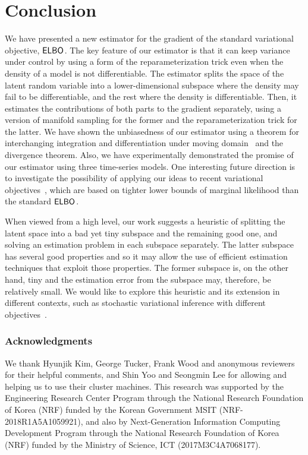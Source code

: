 
\section{Conclusion}
\label{sec:conclusion}

We have presented a new estimator for the gradient of the standard variational objective, ${\mathsf{ELBO}_{}}$. The key feature of our estimator is that it can keep variance under control by using a form of the reparameterization trick even when the density of a model is not differentiable. The estimator splits the space of the latent random variable into a lower-dimensional subspace where the density may fail to be differentiable, and the rest where the density is differentiable. Then, it estimates the contributions of both parts to the gradient separately, using a version of manifold sampling for the former and the reparameterization trick for the latter. We have shown the unbiasedness of our estimator using a theorem for interchanging integration and differentiation under moving domain~\cite{FlandersAMM1973} and the divergence theorem. Also, we have experimentally demonstrated the promise of our estimator using three time-series models. One interesting future direction is to investigate the possibility of applying our ideas to recent variational objectives~\cite{MnihICML16,LiNIPS17,MaddisonNIPS17,LeICLR2018,NaessethAISTATS18}, which are based on tighter lower bounds of marginal likelihood than the standard ${\mathsf{ELBO}_{}}$.

When viewed from a high level, our work suggests a heuristic of splitting the latent space into a bad yet tiny subspace and the remaining good one, and solving an estimation problem in each subspace separately. The latter subspace has several good properties and so it may allow the use of efficient estimation techniques that exploit those properties. The former subspace is, on the other hand, tiny and the estimation error from the subspace may, therefore, be relatively small. We would like to explore this heuristic and its extension in different contexts, such as stochastic variational inference with different objectives~\cite{MnihICML16,LiNIPS17,MaddisonNIPS17,LeICLR2018,NaessethAISTATS18}.

\subsubsection*{Acknowledgments}

We thank Hyunjik Kim, George Tucker, Frank Wood and anonymous reviewers for their helpful comments, and Shin Yoo and Seongmin Lee for allowing and helping us to use their cluster machines. This research was supported by the Engineering Research Center Program through the National Research Foundation of Korea (NRF) funded by the Korean Government MSIT (NRF-2018R1A5A1059921), and also by Next-Generation Information Computing Development Program through the National Research Foundation of Korea (NRF) funded by the Ministry of Science, ICT (2017M3C4A7068177).

